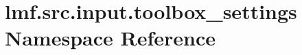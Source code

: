 \hypertarget{namespacelmf_1_1src_1_1input_1_1toolbox__settings}{\section{lmf.\+src.\+input.\+toolbox\+\_\+settings Namespace Reference}
\label{namespacelmf_1_1src_1_1input_1_1toolbox__settings}
}
